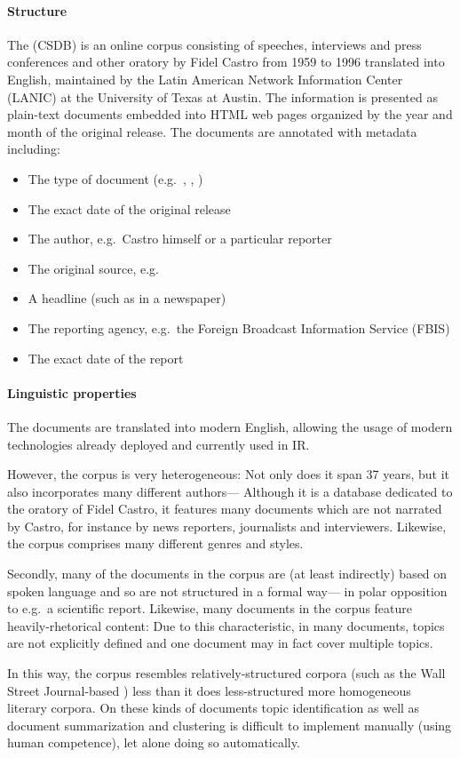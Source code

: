 \paragraph{Structure}
The  (CSDB) is an online corpus consisting of speeches, interviews and press conferences and other oratory by Fidel Castro from 1959 to 1996 translated into English, maintained by the Latin American Network Information Center (LANIC) at the University of Texas at Austin. The information is presented as plain-text documents embedded into HTML web pages organized by the year and month of the original release. The documents are annotated with metadata including:

\begin{itemize}
\item The type of document (e.g.\ , , )
\item The exact date of the original release
\item The author, e.g.\ Castro himself or a particular reporter
\item The original source, e.g.\ 
\item A headline (such as in a newspaper)
\item The reporting agency, e.g.\ the Foreign Broadcast Information Service (FBIS)
\item The exact date of the report
\end{itemize}

\paragraph{Linguistic properties}
The documents are translated into modern English, allowing the usage of modern technologies already deployed and currently used in IR.

However, the corpus is very heterogeneous: Not only does it span 37 years, but it also incorporates many different authors--- Although it is a database dedicated to the oratory of Fidel Castro, it features many documents which are not narrated by Castro, for instance by news reporters, journalists and interviewers. Likewise, the corpus comprises many different genres and styles.

Secondly, many of the documents in the corpus are (at least indirectly) based on spoken language and so are not structured in a formal way--- in polar opposition to e.g.\ a scientific report. Likewise, many documents in the corpus feature heavily-rhetorical content: Due to this characteristic, in many documents, topics are not explicitly defined and one document may in fact cover multiple topics.

In this way, the corpus resembles relatively-structured corpora (such as the Wall Street Journal-based ) less than it does less-structured more homogeneous literary corpora. On these kinds of documents topic identification as well as document summarization and clustering is difficult to implement manually (using human competence), let alone doing so automatically.